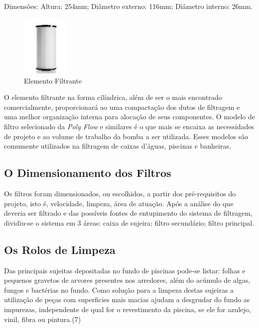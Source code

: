 \begin{description}
Dimensões: Altura: 254mm; Diâmetro externo: 116mm; Diâmetro interno: 26mm.
\par
  \begin{figure}[h]
    \centering
    \includegraphics[width=0.2\textwidth]{figures/filter.png}
    \caption{Elemento Filtrante}
    \label{fig:filter}
  \end{figure}
  \FloatBarrier
\par
O elemento filtrante na forma cilíndrica, além de ser o mais encontrado comercialmente, proporcionará ao \cpr uma compactação dos dutos de filtragem e uma melhor organização interna para alocação de seus componentes. O modelo de filtro selecionado da \textit{Poly Flow} e similares é o que mais se encaixa as necessidades de projeto e ao volume de trabalho da bomba a ser utilizada. Esses modelos são comumente utilizados na filtragem de caixas d’águas, piscinas e banheiras.
\end{description}

\subsection{O Dimensionamento dos Filtros}
Os filtros foram dimensionados, ou escolhidos, a partir dos pré-requisitos do projeto, isto é, velocidade, limpeza, área de atuação. Após a análise do que deveria ser filtrado e das possíveis fontes de entupimento do sistema de filtragem, dividiu-se o sistema em 3 áreas: caixa de sujeira; filtro secundário; filtro principal. 

\subsection{Os Rolos de Limpeza}
Das principais sujeitas depositadas no fundo de piscinas pode-se listar: folhas e pequenos gravetos de arvores presentes nos arredores, além do acúmulo de algas, fungos e bactérias no fundo. Como solução para a limpeza destas sujeiras a utilização de peças com superficies mais macias ajudam a desgrudar do fundo as impurezas, independente de qual for o revestimento da piscina, se ele for azulejo, vinil, fibra ou pintura.(7)

